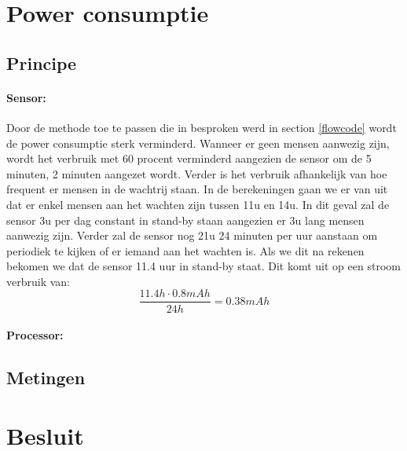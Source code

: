 \documentclass[]{article}
\begin{document}
\section{Power consumptie}

\subsection{Principe}
\paragraph{Sensor: }
Door de methode toe te passen die in besproken werd in section \ref{flowcode} wordt de power consumptie sterk verminderd. Wanneer er geen mensen aanwezig zijn, wordt het verbruik met 60 procent verminderd aangezien de sensor om de 5 minuten, 2 minuten aangezet wordt. Verder is het verbruik afhankelijk van hoe frequent er mensen in de wachtrij staan. In de berekeningen gaan we er van uit dat er enkel mensen aan het wachten zijn tussen 11u en 14u. In dit geval zal de sensor 3u per dag constant in stand-by staan aangezien er 3u lang mensen aanwezig zijn. Verder zal de sensor nog 21u 24 minuten per uur aanstaan om periodiek te kijken of er iemand aan het wachten is. Als we dit na rekenen bekomen we dat de sensor 11.4 uur in stand-by staat. Dit komt uit op een stroom verbruik van: 
\begin{equation}
	\frac{11.4 h\cdot 0.8 mAh}{24 h} = 0.38 mAh
\end{equation}

\paragraph{Processor: }

\subsection{Metingen}


\section{Besluit }
\end{document}

